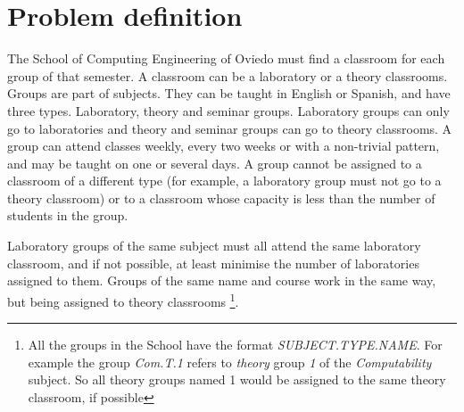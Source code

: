\renewcommand{\documentname}{Problem definition}

\chapter{Problem definition}

The School of Computing Engineering of Oviedo must find a classroom for each group of that semester. A classroom can be a laboratory or a theory classrooms. Groups are part of subjects. They can be taught in English or Spanish, and have three types. Laboratory, theory and seminar groups. Laboratory groups can only go to laboratories and theory and seminar groups can go to theory classrooms. A group can attend classes weekly, every two weeks or with a non-trivial pattern, and may be taught on one or several days. A group cannot be assigned to a classroom of a different type (for example, a laboratory group must not go to a theory classroom) or to a classroom whose capacity is less than the number of students in the group.

Laboratory groups of the same subject must all attend the same laboratory classroom, and if not possible, at least minimise the number of laboratories assigned to them. Groups of the same name and course work in the same way, but being assigned to theory classrooms \footnote{All the groups in the School have the format \textit{SUBJECT.TYPE.NAME}. For example the group \textit{Com.T.1} refers to \textit{theory} group \textit{1} of the \textit{Computability} subject. So all theory groups named 1 would be assigned to the same theory classroom, if possible}.

